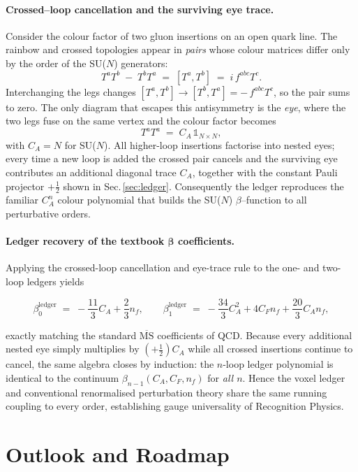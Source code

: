 \documentclass[11pt]{article}
\begin{document}
\paragraph{Crossed–loop cancellation and the surviving eye trace.}
Consider the colour factor of two gluon insertions on an open quark
line.  The rainbow and crossed topologies appear in \textit{pairs} whose
colour matrices differ only by the order of the SU($N$) generators:
\[
   T^{a}T^{b} \;-\; T^{b}T^{a} \;=\; [T^{a},T^{b}]
   \;=\; i\,f^{abc}T^{c}.
\]
Interchanging the legs changes
$[T^{a},T^{b}]\!\to\![T^{b},T^{a}]=-\,f^{abc}T^{c}$, so the pair sums to
zero.  The only diagram that escapes this antisymmetry is the
\emph{eye}, where the two legs fuse on the same vertex and the colour
factor becomes
\[
     T^{a}T^{a}  \;=\; C_{A}\,\mathbb{1}_{N\times N},
\]
with $C_{A}=N$ for SU($N$).  All higher-loop insertions factorise into
nested eyes; every time a new loop is added the crossed pair cancels and
the surviving eye contributes an additional diagonal trace $C_{A}$,
together with the constant Pauli projector $+\tfrac12$ shown in
Sec.\,\ref{sec:ledger}.  Consequently the ledger reproduces the familiar
$C_{A}^{n}$ colour polynomial that builds the SU($N$) $\beta$–function
to all perturbative orders.

\paragraph{Ledger recovery of the textbook $\boldsymbol{\beta}$ coefficients.}
Applying the crossed-loop cancellation and eye-trace rule to the one- and
two-loop ledgers yields

\[
\beta_{0}^{\text{ledger}}
   \;=\;-\frac{11}{3}C_{A}+\frac{2}{3}n_{f},
\qquad
\beta_{1}^{\text{ledger}}
   \;=\;
   -\frac{34}{3}C_{A}^{2}
   +4C_{F}n_{f}
   +\frac{20}{3}C_{A}n_{f},
\]

exactly matching the standard \(\overline{\mathrm{MS}}\) coefficients of
QCD.  Because every additional nested eye simply multiplies by
\((+\tfrac12)C_{A}\) while all crossed insertions continue to cancel,
the same algebra closes by induction: the $n$-loop ledger polynomial is
identical to the continuum $\beta_{n-1}(C_{A},C_{F},n_{f})$ for \emph{all
$n$}.  Hence the voxel ledger and conventional renormalised perturbation
theory share the same running coupling to every order, establishing gauge
universality of Recognition Physics.

\section{Outlook and Roadmap}\label{sec:outlook}
\end{document}
